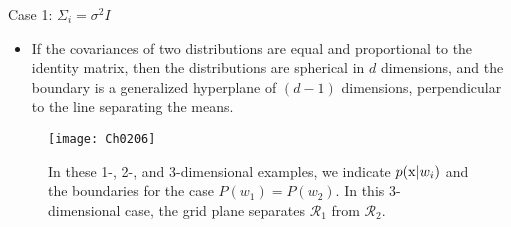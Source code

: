 

\begin{frame}{Case 1: $\Sigma_i=\sigma^2 I$}
\begin{itemize}
\item If the covariances of two distributions are equal and proportional to the identity matrix, then the distributions are spherical in $d$ dimensions, and the boundary is a generalized hyperplane of $(d-1)$ dimensions, perpendicular to the line separating the means.
\end{itemize}
\begin{figure}
\texttt{[image: Ch0206]}
\caption{In these 1-, 2-, and 3-dimensional examples, we indicate $p({\rm x}|w_i)$ and the boundaries for the case $P(w_1)=P(w_2)$. In this 3-dimensional case, the grid plane separates $\mathcal{R}_1$ from $\mathcal{R}_2$.}
\end{figure}
\end{frame}


